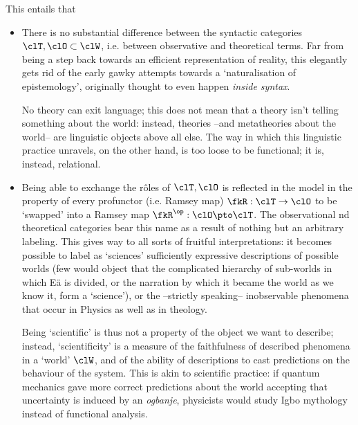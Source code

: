 This entails that
\begin{itemize}
    \item There is no substantial difference between the syntactic categories $\clT,\clO\subset \clW$, i.e. between observative and theoretical terms. Far from being a step back towards an efficient representation of reality, this elegantly gets rid of the early gawky attempts towards a `naturalisation of epistemology', originally thought to even happen \emph{inside syntax}. 
    
    No theory can exit language; this does not mean that a theory isn't telling something about the world: instead, theories --and metatheories about the world-- are linguistic objects above all else. The way in which this linguistic practice unravels, on the other hand, is too loose to be functional; it is, instead, relational.
    \item Being able to exchange the r\^oles of $\clT,\clO$ is reflected in the model in the property of every profunctor (i.e. Ramsey map) $\fkR : \clT \to \clO$ to be `swapped' into a Ramsey map $\fkR^\op : \clO \pto \clT$. The observational nd theoretical categories bear this name as a result of nothing but an arbitrary labeling. This gives way to all sorts of fruitful interpretations: it becomes possible to label as `sciences' sufficiently expressive descriptions of possible worlds (few would object that the complicated hierarchy of sub-worlds in which Eä is divided, or the narration by which it became the world as we know it, form a `science'), or the --strictly speaking-- inobservable phenomena that occur in Physics as well as in theology. 
    
    Being `scientific' is thus not a property of the object we want to describe; instead, `scientificity' is a measure of the faithfulness of described phenomena in a `world' $\clW$, and of the ability of descriptions to cast predictions on the behaviour of the system. This is akin to scientific practice: if quantum mechanics gave more correct predictions about the world accepting that uncertainty is induced by an \emph{ogbanje}, physicists would study Igbo mythology instead of functional analysis.

\end{itemize}


